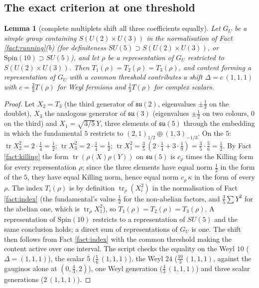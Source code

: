 \documentclass[11pt]{article}
\newtheorem{lemma}[theorem]{Lemma}
\theoremstyle{definition}
\newcommand{\tr}{\operatorname{tr}}
\newcommand{\su}{\mathfrak{su}}
\newcommand{\Dl}{\Delta}
\begin{document}
\subsection{The exact criterion at one threshold}\label{subsec:price}

\begin{lemma}[complete multiplets shift all three coefficients equally]\label{lem:complete}
Let $G_{U}$ be a simple group containing $S(U(2) \times U(3))$ in the normalisation of Fact \ref{fact:running}(b) (for definiteness $SU(5) \supset S(U(2) \times U(3))$, or $\mathrm{Spin}(10) \supset SU(5)$), and let $\rho$ be a representation of $G_{U}$ restricted to $S(U(2) \times U(3))$. Then $T_{1}(\rho) = T_{2}(\rho) = T_{3}(\rho)$, and content forming a representation of $G_{U}$ with a common threshold contributes a shift $\Dl = c\,(1, 1, 1)$ with $c = \tfrac23 T(\rho)$ for Weyl fermions and $\tfrac13 T(\rho)$ for complex scalars.
\end{lemma}

\begin{proof}
Let $X_{2} = T_{3}$ (the third generator of $\su(2)$, eigenvalues $\pm\tfrac12$ on the doublet), $X_{3}$ the analogous generator of $\su(3)$ (eigenvalues $\pm\tfrac12$ on two colours, $0$ on the third) and $X_{1} = \sqrt{3/5}\,Y$, three elements of $\su(5)$ through the embedding in which the fundamental $5$ restricts to $(2,1)_{1/2} \oplus (1,3)_{-1/3}$. On the $5$: $\tr X_{2}^{2} = 2 \cdot \tfrac14 = \tfrac12$; $\tr X_{3}^{2} = 2 \cdot \tfrac14 = \tfrac12$; $\tr X_{1}^{2} = \tfrac35\,(2 \cdot \tfrac14 + 3 \cdot \tfrac19) = \tfrac35 \cdot \tfrac56 = \tfrac12$. By Fact \ref{fact:killing} the form $\tr(\rho(X)\rho(Y))$ on $\su(5)$ is $c_{\rho}$ times the Killing form for every representation $\rho$; since the three elements have equal norm $\tfrac12$ in the form of the $5$, they have equal Killing norm, hence equal norm $c_{\rho}\,\kappa$ in the form of every $\rho$. The index $T_{i}(\rho)$ is by definition $\tr_{\rho}(X_{i}^{2})$ in the normalisation of Fact \ref{fact:index} (the fundamental's value $\tfrac12$ for the non-abelian factors, and $\tfrac35 \sum Y^{2}$ for the abelian one, which is $\tr_{\rho}X_{1}^{2}$), so $T_{1}(\rho) = T_{2}(\rho) = T_{3}(\rho)$. A representation of $\mathrm{Spin}(10)$ restricts to a representation of $SU(5)$ and the same conclusion holds; a direct sum of representations of $G_{U}$ is one. The shift then follows from Fact \ref{fact:index} with the common threshold making the content active over one interval. The script checks the equality on the Weyl $10$ ($\Dl = (1,1,1)$), the scalar $\bar{5}$ ($\tfrac16\,(1,1,1)$), the Weyl $24$ ($\tfrac{10}{3}\,(1,1,1)$, against the gauginos alone at $(0, \tfrac43, 2)$), one Weyl generation ($\tfrac43\,(1,1,1)$) and three scalar generations ($2\,(1,1,1)$).
\end{proof}
\end{document}
